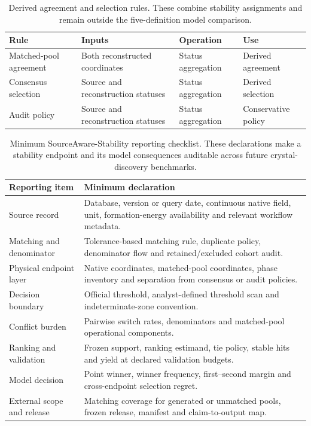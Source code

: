 \begin{table}[H]
\centering
\sitablefont
\caption{Derived agreement and selection rules. These combine stability assignments and remain outside the five-definition model comparison.}
\label{tab:derived-rules}
\begin{tabular}{@{}P{0.23\textwidth}P{0.32\textwidth}P{0.19\textwidth}P{0.16\textwidth}@{}}
\toprule
Rule & Inputs & Operation & Use \\
\midrule
Matched-pool agreement & Both reconstructed coordinates & Status aggregation & Derived agreement \\
Consensus selection & Source and reconstruction statuses & Status aggregation & Derived selection \\
Audit policy & Source and reconstruction statuses & Status aggregation & Conservative policy \\
\bottomrule
\end{tabular}
\end{table}

\begin{table}[H]
\centering
\caption{Minimum SourceAware-Stability reporting checklist. These declarations make a stability endpoint and its model consequences auditable across future crystal-discovery benchmarks.}
\label{tab:sourceaware-checklist}
\sitablefont
\begin{tabular}{@{}P{0.27\textwidth}P{0.63\textwidth}@{}}
\toprule
Reporting item & Minimum declaration \\
\midrule
Source record & Database, version or query date, continuous native field, unit, formation-energy availability and relevant workflow metadata. \\
Matching and denominator & Tolerance-based matching rule, duplicate policy, denominator flow and retained/excluded cohort audit. \\
Physical endpoint layer & Native coordinates, matched-pool coordinates, phase inventory and separation from consensus or audit policies. \\
Decision boundary & Official threshold, analyst-defined threshold scan and indeterminate-zone convention. \\
Conflict burden & Pairwise switch rates, denominators and matched-pool operational components. \\
Ranking and validation & Frozen support, ranking estimand, tie policy, stable hits and yield at declared validation budgets. \\
Model decision & Point winner, winner frequency, first--second margin and cross-endpoint selection regret. \\
External scope and release & Matching coverage for generated or unmatched pools, frozen release, manifest and claim-to-output map. \\
\bottomrule
\end{tabular}
\end{table}
